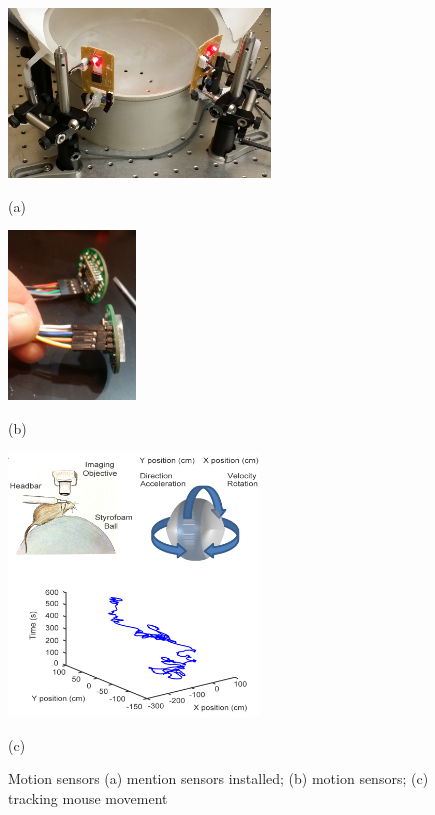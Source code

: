 \begin{figure}[htb]
	\begin{minipage}[t]{0.45\linewidth}\centering
		\includegraphics[height=4.5cm]{2_body/figures/01-motion-sensors-installed.jpg}
		\centerline{(a)}
	\end{minipage}
	\hfill
	\begin{minipage}[t]{0.45\linewidth}\centering
		\includegraphics[height=4.5cm]{2_body/figures/02-motion-sensors.jpg}
		\centerline{(b)}
	\end{minipage}
	\begin{minipage}[t]{\linewidth}\centering
		\includegraphics[height=7cm]{2_body/figures/Striatum_Figure2.png}
		\centerline{(c)}
	\end{minipage}
	\caption{
		Motion sensors (a) mention sensors installed;
		(b) motion sensors; (c) tracking mouse movement}
	\label{fig:motion sensors}
\end{figure}

